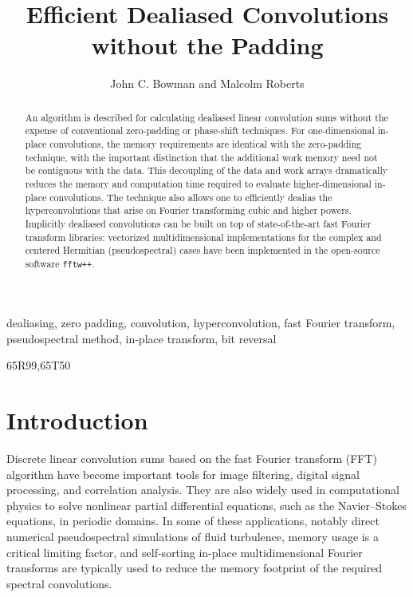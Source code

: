 \documentclass[final]{siamltex}
\begin{document}
\title{Efficient Dealiased Convolutions without the Padding}
\author{John C. Bowman and Malcolm Roberts}
\maketitle

\begin{abstract}
An algorithm is described for calculating dealiased linear convolution sums
without the expense of conventional zero-padding or phase-shift
techniques. For one-dimensional in-place convolutions, the memory
requirements are identical with the zero-padding technique, with the important
distinction that the additional work memory need not be contiguous with the
data. This decoupling of the data and work arrays dramatically reduces
the memory and computation time required to evaluate higher-dimensional
in-place convolutions. The technique also allows one to efficiently dealias the
hyperconvolutions that arise on Fourier transforming cubic and higher powers.
Implicitly dealiased convolutions can be built on top of state-of-the-art
fast Fourier transform libraries: vectorized multidimensional implementations
for the complex and centered Hermitian (pseudospectral) cases have
been implemented in the open-source software {\tt fftw++}.
\end{abstract} 

\begin{keywords} 
dealiasing, zero padding, convolution, hyperconvolution, fast Fourier transform,
pseudospectral method, in-place transform, bit reversal
\end{keywords}

\begin{AMS}
65R99,65T50
\end{AMS}

\pagestyle{myheadings}



\section{Introduction}
Discrete linear convolution sums based on the fast Fourier transform
(FFT) algorithm \cite{Gauss1866,Cooley65} have become important tools
for image filtering, digital signal processing, and correlation
analysis. They are also widely used in computational physics to solve
nonlinear partial differential equations, such as the Navier--Stokes
equations, in periodic domains. In some of these applications, notably
direct numerical pseudospectral simulations of fluid turbulence,
memory usage is a critical limiting factor, and self-sorting in-place
multidimensional Fourier transforms \cite{Temperton91} are typically used to
reduce the memory footprint of the required spectral convolutions.
\end{document}
